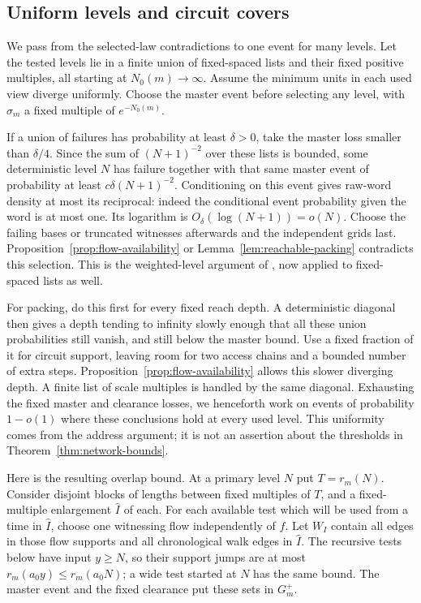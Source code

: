 \subsection{Uniform levels and circuit covers}

We pass from the selected-law contradictions to one event for
many levels.  Let the tested levels lie in a finite union of
fixed-spaced lists and their fixed positive multiples, all
starting at \(N_0(m)\to\infty\).  Assume the minimum units in
each used view diverge uniformly.  Choose the master event
before selecting any level, with
\(\sigma_m\) a fixed multiple of \(e^{-N_0(m)}\).

If a union of failures has probability at least \(\delta>0\),
take the master loss smaller than \(\delta/4\).  Since the sum
of \((N+1)^{-2}\) over these lists is bounded, some deterministic
level \(N\) has failure together with that same master event
of probability at least \(c\delta(N+1)^{-2}\).  Conditioning
on this event gives raw-word density at most its reciprocal:
indeed the conditional event probability given the word is at
most one.  Its logarithm is \(O_\delta(\log(N+1))=o(N)\).
Choose the failing bases or truncated witnesses afterwards and
the independent grids last.  Proposition~\ref{prop:flow-availability}
or Lemma~\ref{lem:reachable-packing} contradicts this selection.
This is the weighted-level argument of
\cite[Lemma~12.5]{P}, now applied to fixed-spaced lists as well.

For packing, do this first for every fixed reach depth.  A
deterministic diagonal then gives a depth tending to infinity
slowly enough that all these union probabilities still vanish,
and still below the master bound.  Use a fixed fraction of it
for circuit support, leaving room for two access chains and a
bounded number of extra steps.  Proposition~\ref{prop:flow-availability}
allows this slower diverging depth.  A finite list of scale
multiples is handled by the same diagonal.  Exhausting the
fixed master and clearance losses, we henceforth work on events
of probability \(1-o(1)\) where these conclusions hold at
every used level.  This uniformity comes from the address
argument; it is not an assertion about the thresholds in
Theorem~\ref{thm:network-bounds}.

Here is the resulting overlap bound.  At a primary level \(N\)
put \(T=r_m(N)\).  Consider disjoint blocks of lengths between
fixed multiples of \(T\), and a fixed-multiple enlargement
\(\widehat I\) of each.  For each available test which will be
used from a time in \(\widehat I\), choose one witnessing flow
independently of \(f\).  Let \(W_I\) contain all edges in those
flow supports and all chronological walk edges in \(\widehat I\).
The recursive tests below have input \(y\ge N\), so their
support jumps are at most \(r_m(a_0y)\le r_m(a_0N)\); a wide
test started at \(N\) has the same bound.  The master event
and the fixed clearance put these sets in \(G_m^+\).

